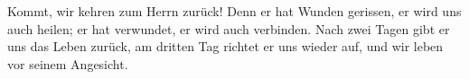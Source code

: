 \lettrine[lines=3]{K}{}ommt, wir kehren zum Herrn zurück! Denn er hat Wunden gerissen, er wird uns auch heilen; er hat verwundet, er wird auch verbinden. Nach zwei Tagen gibt er uns das Leben zurück, am dritten Tag richtet er uns wieder auf, und wir leben vor seinem Angesicht.